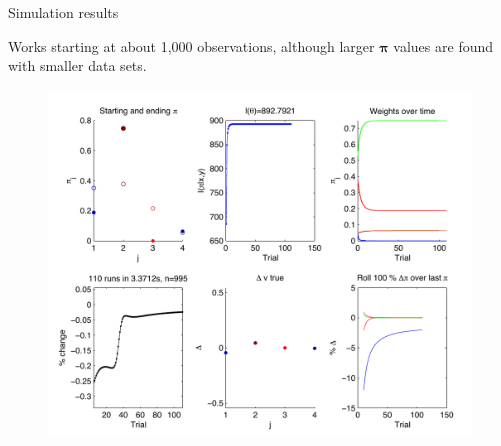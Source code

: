 \documentclass{beamer}
\newcommand{\vect}[1]{\boldsymbol{\mathbf{#1}}}
\newcommand{\vp}{\vect{\pi}}
\begin{document}
\begin{frame}{Simulation results}
	
	Works starting at about 1,000 observations, although larger $\vp$ values are found with smaller data sets.
	
	\begin{figure}
			\begin{center}
				\includegraphics[scale=0.5]{diagnosticstalk.pdf}
			\end{center}
	\end{figure}
	
\end{frame}
\end{document}
